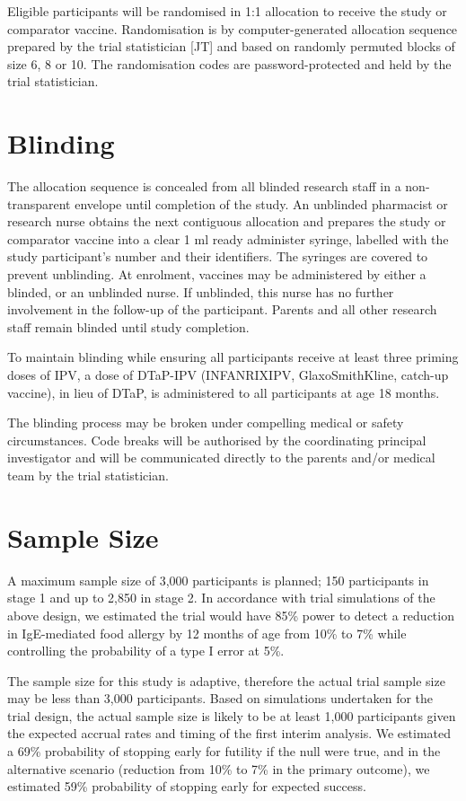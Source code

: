 \documentclass{bmcart}
\begin{document}
Eligible participants will be randomised in 1:1 allocation to receive the study or comparator vaccine.
Randomisation is by computer-generated allocation sequence prepared by the trial statistician [JT] and based on randomly permuted blocks of size 6, 8 or 10.
The randomisation codes are password-protected and held by the trial statistician.

\section*{Blinding}

The allocation sequence is concealed from all blinded research staff in a non-transparent envelope until completion of the study.
An unblinded pharmacist or research nurse obtains the next contiguous allocation and prepares the study or comparator vaccine into a clear 1 ml ready administer syringe, labelled with the study participant's number and their identifiers.
The syringes are covered to prevent unblinding.
At enrolment, vaccines may be administered by either a blinded, or an unblinded nurse.
If unblinded, this nurse has no further involvement in the follow-up of the participant.
Parents and all other research staff remain blinded until study completion.

To maintain blinding while ensuring all participants receive at least three priming doses of IPV, a dose of DTaP-IPV (INFANRIX\textregistered IPV, GlaxoSmithKline, catch-up vaccine), in lieu of DTaP, is administered to all participants at age 18 months.

The blinding process may be broken under compelling medical or safety circumstances. 
Code breaks will be authorised by the coordinating principal investigator and will be communicated directly to the parents and/or medical team by the trial statistician.

\section*{Sample Size}

A maximum sample size of 3,000 participants is planned; 150 participants in stage 1 and up to 2,850 in stage 2.
In accordance with trial simulations of the above design, we estimated the trial would have 85\% power to detect a reduction in IgE-mediated food allergy by 12 months of age from 10\% to 7\% while controlling the probability of a type I error at 5\%.

The sample size for this study is adaptive, therefore the actual trial sample size may be less than 3,000 participants. Based on simulations undertaken for the trial design, the actual sample size is likely to be at least 1,000 participants given the expected accrual rates and timing of the first interim analysis.
We estimated a 69\% probability of stopping early for futility if the null were true, and in the alternative scenario (reduction from 10\% to 7\% in the primary outcome), we estimated 59\% probability of stopping early for expected success.
\end{document}
